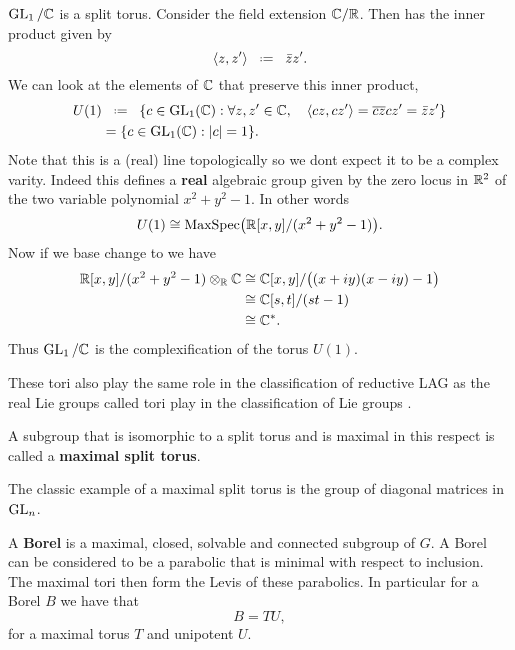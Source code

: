    \begin{example}
        \(\GL_1 /\C\) is a split torus. Consider the field extension \(\C/\R\). Then \C has the inner product given by 
        \[\inner{z, z'} \defeq \bar{z}z'.\]
        We can look at the elements of \(\C\) that preserve this inner product, 
        \begin{align*}
            U(1)&\defeq \{c\in \GL_1(\C) : \forall z,z'\in \C , \quad \inner{cz, cz'} = \overline{cz}cz' = \bar{z}z'\} \\
             &= \{c\in \GL_1(\C) : |c| = 1\}.
        \end{align*}
        Note that this is a (real) line topologically so we dont expect it to be a complex varity. Indeed this defines a \textbf{real} algebraic group given by the zero locus in \(\R^2\) of the two variable polynomial \(x^2 + y^2 - 1\). In other words
        \[ U(1) \cong \mathrm{MaxSpec}\big(\R[x,y]/(x^2 + y^2 - 1)\big) .\]
        Now if we base change to \C we have 
        \begin{align*}
            \R[x,y]/(x^2 + y^2 - 1) \tensor_\R \C &\cong \C[x,y]/\big((x+iy)(x-iy) -1 \big)\\
             &\cong \C[s,t]/(st -1) \\
             &\cong \C^\ast.
        \end{align*}
        Thus \(\GL_1 / \C\) is the complexification of the torus \(U(1)\).
    \end{example}
    
    \begin{remark}
        These tori also play the same role in the classification of reductive LAG as the real Lie groups called tori play in the classification of Lie groups \cite{hallLieGroupsLie2015}.
    \end{remark}
    
    A subgroup that is isomorphic to a split torus and is maximal in this respect is called a \textbf{maximal split torus}. 
     \begin{example}
        The classic example of a maximal split torus is the group of diagonal matrices in \(\operatorname{GL}_n\).
     \end{example}

    A \textbf{Borel} is a maximal, closed, solvable and connected subgroup of \(G\). A Borel can be considered to be a parabolic that is minimal with respect to inclusion. The maximal tori then form the Levis of these parabolics. In particular for a Borel \(B\) we have that 
    \[B = TU,\]
    for a maximal torus \(T\) and unipotent \(U\).

